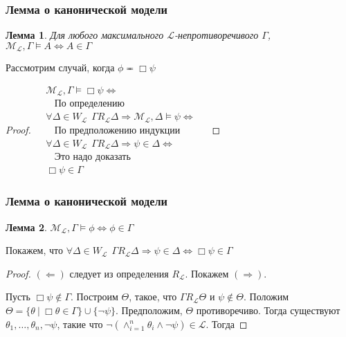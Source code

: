 \documentclass[pdf,utf8,russian,aspectratio=169]{beamer}
\newtheorem{lem}{Лемма}
\begin{document}
\begin{frame}
  \frametitle{Лемма о канонической модели}
  \begin{lem}
    Для любого максимального $\mathcal{L}$-непротиворечивого $\Gamma$, $\mathcal{M}_{\mathcal{L}}, \Gamma \models A \Leftrightarrow A \in \Gamma$
  \end{lem}

Рассмотрим случай, когда $\phi \eqcirc \Box \psi$

  \begin{proof}
    $\begin{array}{lll}
    & \mathcal{M}_{\mathcal{L}}, \Gamma \models \Box \psi \Leftrightarrow & \\
    & \:\:\:\: \text{По определению}& \\
    & \forall \Delta \in W_{\mathcal{L}} \:\: \Gamma R_{\mathcal{L}} \Delta \Rightarrow \mathcal{M}_{\mathcal{L}}, \Delta \models \psi \Leftrightarrow & \\
    & \:\:\:\: \text{По предположению индукции}& \\
    & \forall \Delta \in W_{\mathcal{L}} \:\: \Gamma R_{\mathcal{L}} \Delta \Rightarrow \psi \in \Delta \Leftrightarrow & \\
    & \:\:\:\: \text{Это надо доказать}& \\
    & \Box \psi \in \Gamma&
    \end{array}$
  \end{proof}
\end{frame}

\begin{frame}
  \frametitle{Лемма о канонической модели}
  \begin{lem}
    $\mathcal{M}_{\mathcal{L}}, \Gamma \models \phi \Leftrightarrow \phi \in \Gamma$
  \end{lem}

  Покажем, что $\forall \Delta \in W_{\mathcal{L}} \:\: \Gamma R_{\mathcal{L}} \Delta \Rightarrow \psi \in \Delta \Leftrightarrow \Box \psi \in \Gamma$

  \begin{proof}
    $(\Leftarrow)$ следует из определения $R_{\mathcal{L}}$. Покажем $(\Rightarrow)$.

    Пусть $\Box \psi \notin \Gamma$. Построим $\Theta$, такое, что $\Gamma R_{\mathcal{L}} \Theta$ и $\psi \notin \Theta$. Положим $\Theta = \{ \theta \: | \: \Box \theta \in \Gamma \} \cup \{ \neg \psi \}$. Предположим, $\Theta$ противоречиво.
    Тогда существуют $\theta_1, \dots, \theta_n, \neg \psi$, такие что $\neg (\land_{i=1}^{n} \theta_i \land \neg \psi) \in \mathcal{L}$. Тогда

  \end{proof}
\end{frame}
\end{document}
